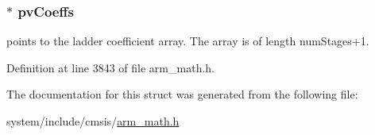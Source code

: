 \subsubsection[{\texorpdfstring{pv\+Coeffs}{pvCoeffs}}]{$\ast$ pv\+Coeffs}\hypertarget{structarm__iir__lattice__instance__q15_a52866ed127c7b2a8a102e2ed1a2ebab8}{}\label{structarm__iir__lattice__instance__q15_a52866ed127c7b2a8a102e2ed1a2ebab8}
points to the ladder coefficient array. The array is of length num\+Stages+1. 

Definition at line 3843 of file arm\+\_\+math.\+h.



The documentation for this struct was generated from the following file\+:\begin{DoxyCompactItemize}
\item 
system/include/cmsis/\hyperlink{arm__math_8h}{arm\+\_\+math.\+h}\end{DoxyCompactItemize}
